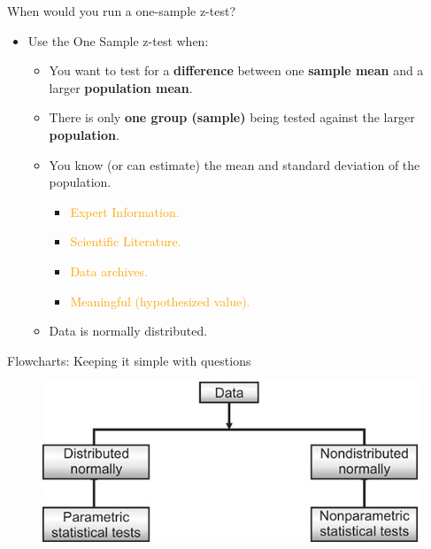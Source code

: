 \documentclass[
  ignorenonframetext,
]{beamer}
\providecommand{\tightlist}{%
  \setlength{\itemsep}{0pt}\setlength{\parskip}{0pt}}
\begin{document}
\begin{frame}{When would you run a one-sample z-test?}
\label{when-would-you-run-a-one-sample-z-test-1}
\begin{itemize}
\tightlist
\item
  Use the One Sample z-test when:

  \begin{itemize}
  \tightlist
  \item
    You want to test for a \textbf{difference} between one
    \textbf{sample mean} and a larger \textbf{population mean}.
  \item
    There is only \textbf{one group (sample)} being tested against the
    larger \textbf{population}.
  \item
    You know (or can estimate) the mean and standard deviation of the
    population.

    \begin{itemize}
    \tightlist
    \item
      \textcolor{orange}{Expert Information.}
    \item
      \textcolor{orange}{Scientific Literature.}
    \item
      \textcolor{orange}{Data archives.}
    \item
      \textcolor{orange}{Meaningful (hypothesized value).}
    \end{itemize}
  \item
    Data is normally distributed.
  \end{itemize}
\end{itemize}
\end{frame}

\begin{frame}{Flowcharts: Keeping it simple with questions}
\label{flowcharts-keeping-it-simple-with-questions}
\begin{figure}

{\centering \includegraphics[width=0.6\linewidth]{fig/parametric} 

}

\end{figure}
\end{frame}
\end{document}
